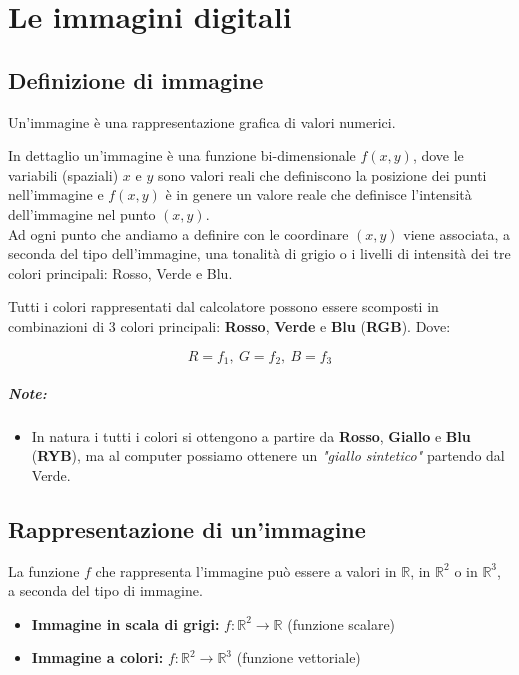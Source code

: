 \chapter{Le immagini digitali}

\section{Definizione di immagine}

\begin{definition}
    Un'immagine è una rappresentazione grafica di valori numerici.
\end{definition}

In dettaglio un'immagine è una funzione bi-dimensionale $f(x,y)$, dove le
variabili (spaziali) $x$ e $y$ sono valori reali che definiscono la posizione
dei punti nell'immagine e $f(x,y)$ è in genere un valore reale che definisce
l'intensità dell'immagine nel punto $(x,y)$.\\
Ad ogni punto che andiamo a definire con le coordinare $(x,y)$ viene associata,
a seconda del tipo dell'immagine, una tonalità di grigio o i livelli di intensità
dei tre colori principali: Rosso, Verde e Blu.

Tutti i colori rappresentati dal calcolatore possono essere scomposti
in combinazioni di 3 colori principali: \textbf{Rosso}, \textbf{Verde} e
\textbf{Blu} (\textbf{RGB}). Dove:

$$
    R = f_1, \ G = f_2, \ B = f_3
$$

\paragraph{Note:}
\begin{itemize}
    \item In natura i tutti i colori si ottengono a partire da \textbf{Rosso},
          \textbf{Giallo} e \textbf{Blu} (\textbf{RYB}), ma al computer possiamo ottenere
          un \textit{"giallo sintetico"} partendo dal Verde.
\end{itemize}

\section{Rappresentazione di un'immagine}
La funzione $f$ che rappresenta l'immagine può essere a valori in $\mathbb{R}$,
in $\mathbb{R}^2$ o in $\mathbb{R}^3$, a seconda del tipo di immagine.

\begin{itemize}
    \item \textbf{Immagine in scala di grigi:} $f:\mathbb{R}^2 \rightarrow \mathbb{R}$ (funzione
          scalare)
    \item \textbf{Immagine a colori:} $f:\mathbb{R}^2 \rightarrow \mathbb{R}^3$ (funzione
          vettoriale)
\end{itemize}

